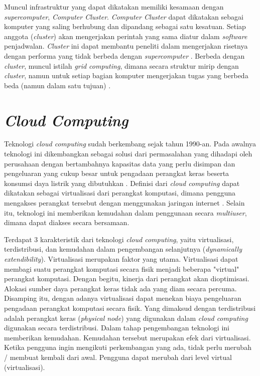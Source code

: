 Muncul infrastruktur yang dapat dikatakan memiliki kesamaan dengan \textit{supercomputer}, \textit{Computer Cluster}. \textit{Computer Cluster} dapat dikatakan sebagai komputer yang saling berhubung dan dipandang sebagai satu kesatuan. Setiap anggota (\textit{cluster}) akan mengerjakan perintah yang sama diatur dalam \textit{software} penjadwalan. \textit{Cluster} ini dapat membantu peneliti dalam mengerjakan risetnya dengan performa yang tidak berbeda dengan \textit{supercomputer} \cite{cluster_pak hilman}. Berbeda dengan \textit{cluster}, muncul istilah \textit{grid computing}, dimana secara struktur mirip dengan \textit{cluster}, namun untuk setiap bagian komputer mengerjakan tugas yang berbeda beda (namun dalam satu tujuan) \cite{grid}.
  
\section{\textit{Cloud Computing}}
\hspace{0.5cm}Teknologi \textit{cloud computing} sudah berkembang sejak tahun 1990-an. Pada awalnya teknologi ini dikembangkan sebagai solusi dari permasalahan yang dihadapi oleh perusahaan dengan bertambahnya kapasitas data yang perlu disimpan dan pengeluaran yang cukup besar untuk pengadaan perangkat keras beserta konsumsi daya listrik yang dibutuhkan \cite{Cloud Computing: Overview and Risk Analysis}. Definisi dari \textit{cloud computing} dapat dikatakan sebagai virtualisasi dari perangkat komputasi, dimana pengguna mengakses perangkat tersebut dengan menggunakan jaringan internet \cite{Cloud Computing Research and Development Trend}. Selain itu, teknologi ini memberikan kemudahan dalam penggunaan secara \textit{multiuser}, dimana dapat diakses secara bersamaan.

Terdapat 3 karakteristik dari teknologi \textit{cloud computing}, yaitu virtualisasi, terdistribusi, dan kemudahan dalam pengembangan selanjutnya (\textit{dynamically extendibility}). Virtualisasi merupakan faktor yang utama. Virtualisasi dapat membagi suatu perangkat komputasi secara fisik menjadi beberapa "virtual" perangkat komputasi. Dengan begitu, kinerja dari perangkat akan dioptimisasi. Alokasi sumber daya perangkat keras tidak ada yang diam secara percuma. Disamping itu, dengan adanya virtualisasi dapat menekan biaya pengeluaran pengadaan perangkat komputasi secara fisik. Yang dimaksud dengan terdistribusi adalah perangkat keras (\textit{physical node}) yang digunakan dalam \textit{cloud computing} digunakan secara terdistribusi. Dalam tahap pengembangan teknologi ini memberikan kemudahan. Kemudahan tersebut merupakan efek dari virtualisasi. Ketika pengguna ingin mengikuti perkembangan yang ada, tidak perlu merubah / membuat kembali dari awal. Pengguna dapat merubah dari level virtual (virtualisasi).



